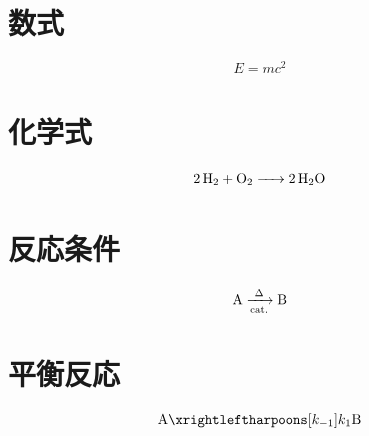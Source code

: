 \documentclass{ltjsarticle}
\begin{document}
\section{数式}

\[
E = mc^2
\]

\section{化学式}

\[
\ce{2H2 + O2 -> 2H2O}
\]

\section{反応条件}

\[
\ce{A}
\xrightarrow[\mathrm{cat.}]{\Delta}
\ce{B}
\]

\section{平衡反応}

\[
\ce{A}
\xrightleftharpoons[k_{-1}]{k_1}
\ce{B}
\]
\end{document}
